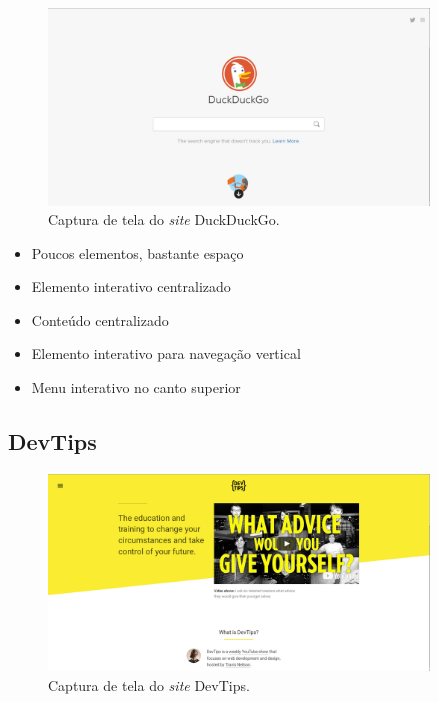 \begin{figure}[!htbp]
\centering
\caption{\label{fig-ddgo}Captura de tela do \emph{site} DuckDuckGo.}
\includegraphics[width=0.9\textwidth]{images/tendencias/ddgo.png}
\end{figure}

\begin{itemize}
\tightlist
\item
  Poucos elementos, bastante espaço
\item
  Elemento interativo centralizado
\item
  Conteúdo centralizado
\item
  Elemento interativo para navegação vertical
\item
  Menu interativo no canto superior
\end{itemize}

\subsection{DevTips}\label{devtips}

\begin{figure}[!htbp]
\centering
\caption{\label{fig-travis}Captura de tela do \emph{site} DevTips.}
\includegraphics[width=0.9\textwidth]{images/tendencias/devtips.png}
\end{figure}

